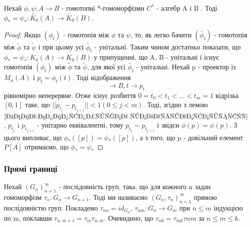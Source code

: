 \begin{theorem}
    \label{теорема: гомотопічна інваріантність К0}
    Нехай $\phi, \psi: A \rightarrow B$ - гомотопні *-гомоморфізми $C^*$ - алгебр A і B .
    Тоді $\phi_* = \psi_*: \widetilde{K_0}(A) \rightarrow \widetilde{K_0}(B)$.

    \begin{proof}
        Якщо $(\phi_t)$ - гомотопія між $\phi$ та $\psi$, то, як легко бачити $(\widetilde{\phi_t})$ -
        гомотопія між $\widetilde{\phi}$ та $\widetilde{\psi}$ і при цьому усі $\widetilde{\phi_t}$ - унітальні.
        Таким чином достатньо показати, що $\phi_* = \psi_*: K_0(A) \rightarrow K_0(B)$ у припущенні, що A, B - унітальні
        і існує гомотопія $(\phi_t)$ між $\widetilde{\phi}$ та $\widetilde{\psi}$, для якої усі $\widetilde{\phi_t}$ - унітальні.
        Нехай p - проектор із $M_n(A)$ і $p_t = \phi_t(t)$.
        Тоді відображення
        \begin{equation*}
        [0,1]
            \rightarrow B, t \rightarrow p_t
        \end{equation*}
        рівномірно неперервне.
        Отже існує розбиття $0 = t_0 < t_1 < \dots < t_m = 1$ відрізка $[0,1]$ таке, що
        $||p_{t_j} - p_{t_{j+1}}|| < 1 (0 \leq j < m)$.
        Тоді, згідно з лемою $\ref{лема:гомотопічна інваріантність}$, $p_{t_j}$ i $p_{t_{j+1}}$ - унітарно еквівалентні,
        тому $p_{t_j} \sim p_{t_{j+1}}$ і звідси $\phi(p) = \psi(p)$.
        З цього випливає, що $\phi_*([p]) = \psi_*([p])$, а з того, що p - довільний елемент $P[A]$ отримаємо, що
        $\phi_* = \psi_*$
    \end{proof}
\end{theorem}

\subsubsection{Прямі границі}
\begin{definition}
    Нехай $(G_n)_{n=1}^{\infty}$ - послідовність груп, така, що для кожного n задан гомоморфізм $\tau_n: G_n \rightarrow G_{n+1}$.
    Тоді ми називаємо $(G_n, \tau_n)_{n=1}^{\infty}$ прямою послідовністю груп.
    Покладемо $\tau_{nn} = id_{G_n}$, $\tau_{nm}: G_n \rightarrow G_m$ при $n \leq m$ індукцією по m, поклавши $\tau_{n,m+1}=\tau_m \tau_{n, m}$.
    Очевидино, що $\tau_{nk} = \tau_{mk} \tau{nm}$ за $n \leq m \leq k$.
\end{definition}

